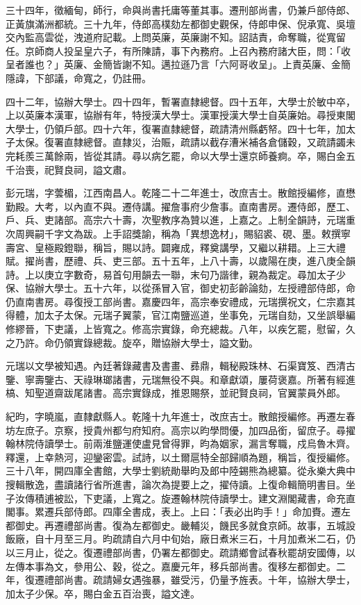 \begin{pinyinscope}
三十四年，徵緬甸，師行，命與尚書托庸等董其事。遷刑部尚書，仍兼戶部侍郎、正黃旗滿洲都統。三十九年，侍郎高樸劾左都御史觀保，侍郎申保、倪承寬、吳壇交內監高雲從，洩道府記載。上問英廉，英廉謝不知。詔詰責，命奪職，從寬留任。京師商人投呈皇六子，有所陳請，事下內務府。上召內務府諸大臣，問：「收呈者誰也？」英廉、金簡皆謝不知。邁拉遜乃言「六阿哥收呈」。上責英廉、金簡隱諱，下部議，命寬之，仍註冊。

四十二年，協辦大學士。四十四年，暫署直隸總督。四十五年，大學士於敏中卒，上以英廉本漢軍，協辦有年，特授漢大學士。漢軍授漢大學士自英廉始。尋授東閣大學士，仍領戶部。四十六年，復署直隸總督，疏請清州縣虧帑。四十七年，加太子太保。復署直隸總督。直隸災，治賑，疏請以截存漕米補各倉儲穀，又疏請蠲未完耗羨三萬餘兩，皆從其請。尋以病乞罷，命以大學士還京師養痾。卒，賜白金五千治喪，祀賢良祠，謚文肅。

彭元瑞，字蕓楣，江西南昌人。乾隆二十二年進士，改庶吉士。散館授編修，直懋勤殿。大考，以內直不與。遷侍講。擢詹事府少詹事。直南書房。遷侍郎，歷工、戶、兵、吏諸部。高宗六十壽，次聖教序為贊以進，上嘉之。上制全韻詩，元瑞重次周興嗣千字文為跋。上手詔獎諭，稱為「異想逸材」，賜貂裘、硯、墨。敕撰寧壽宮、皇極殿鐙聯，稱旨，賜以詩。闢雍成，釋奠講學，又繼以耕耤。上三大禮賦。擢尚書，歷禮、兵、吏三部。五十五年，上八十壽，以歲陽在庚，進八庚全韻詩。上以庚立字數奇，易首句用韻去一聯，末句乃諧律，親為裁定。尋加太子少保、協辦大學士。五十六年，以從孫冒入官，御史初彭齡論劾，左授禮部侍郎，命仍直南書房。尋復授工部尚書。嘉慶四年，高宗奉安禮成，元瑞撰祝文，仁宗嘉其得體，加太子太保。元瑞子翼蒙，官江南鹽巡道，坐事免，元瑞自劾，又坐誤舉編修繆晉，下吏議，上皆寬之。修高宗實錄，命充總裁。八年，以疾乞罷，慰留，久之乃許。命仍領實錄總裁。旋卒，贈協辦大學士，謚文勤。

元瑞以文學被知遇。內廷著錄藏書及書畫、彞鼎，輯秘殿珠林、石渠寶笈、西清古鑒、寧壽鑒古、天祿琳瑯諸書，元瑞無役不與。和章獻頌，屢荷褒嘉。所著有經進槁、知聖道齋跋尾諸書。高宗實錄成，推恩賜祭，並祀賢良祠，官翼蒙員外郎。

紀昀，字曉嵐，直隸獻縣人。乾隆十九年進士，改庶吉士。散館授編修。再遷左春坊左庶子。京察，授貴州都勻府知府。高宗以昀學問優，加四品銜，留庶子。尋擢翰林院侍讀學士。前兩淮鹽運使盧見曾得罪，昀為姻家，漏言奪職，戍烏魯木齊。釋還，上幸熱河，迎鑾密雲。試詩，以土爾扈特全部歸順為題，稱旨，復授編修。三十八年，開四庫全書館，大學士劉統勛舉昀及郎中陸錫熊為總纂。從永樂大典中搜輯散逸，盡讀諸行省所進書，論次為提要上之，擢侍讀。上復命輯簡明書目。坐子汝傳積逋被訟，下吏議，上寬之。旋遷翰林院侍讀學士。建文淵閣藏書，命充直閣事。累遷兵部侍郎。四庫全書成，表上。上曰：「表必出昀手！」命加賚。遷左都御史。再遷禮部尚書。復為左都御史。畿輔災，饑民多就食京師。故事，五城設飯廠，自十月至三月。昀疏請自六月中旬始，廠日煮米三石，十月加煮米二石，仍以三月止，從之。復遷禮部尚書，仍署左都御史。疏請鄉會試春秋罷胡安國傳，以左傳本事為文，參用公、穀，從之。嘉慶元年，移兵部尚書。復移左都御史。二年，復遷禮部尚書。疏請婦女遇強暴，雖受污，仍量予旌表。十年，協辦大學士，加太子少保。卒，賜白金五百治喪，謚文達。


\end{pinyinscope}
